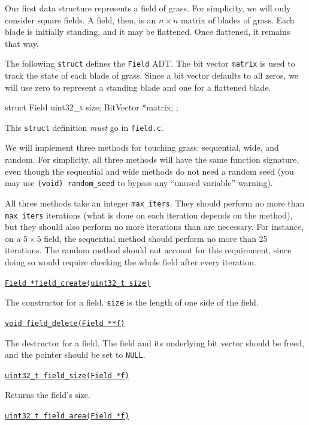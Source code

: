 \documentclass[11pt]{article}
\begin{document}
\noindent
Our first data structure represents a field of grass. For simplicity, we will only consider square fields. A field, then, is an $n \times n$ matrix of blades of grass. Each blade is initially standing, and it may be flattened. Once flattened, it remains that way.

The following \texttt{struct} defines the \texttt{Field} ADT. The bit vector \texttt{matrix} is used to track the state of each blade of grass. Since a bit vector defaults to all zeros, we will use zero to represent a standing blade and one for a flattened blade.

\begin{clisting}{}
struct Field {
    uint32_t size;
    BitVector *matrix;
};
\end{clisting}

This \texttt{struct} definition \emph{must} go in \texttt{field.c}.

We will implement three methods for touching grass: sequential, wide, and random. For simplicity, all three methods will have the same function signature, even though the sequential and wide methods do not need a random seed (you may use \texttt{(void) random\_seed} to bypass any ``unused variable'' warning).

All three methods take an integer \texttt{max\_iters}. They should perform no more than \texttt{max\_iters} iterations (what is done on each iteration depends on the method), but they should also perform no more iterations than are necessary. For instance, on a $5 \times 5$ field, the sequential method should perform no more than 25 iterations. The random method should not account for this requirement, since doing so would require checking the whole field after every iteration.

\setlength{\parindent}{0pt}
\setlength{\parskip}{6pt}

\underline{\texttt{Field *field\_create(uint32\_t size)}}

The constructor for a field. \texttt{size} is the length of one side of the field.
\medskip

\underline{\texttt{void field\_delete(Field **f)}}

The destructor for a field. The field and its underlying bit vector should be freed, and the pointer should be set to \texttt{NULL}.
\medskip

\underline{\texttt{uint32\_t field\_size(Field *f)}}

Returns the field's size.
\medskip

\underline{\texttt{uint32\_t field\_area(Field *f)}}
\end{document}
